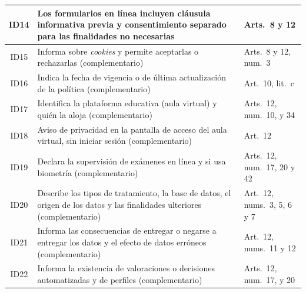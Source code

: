 \documentclass[11pt,a4paper]{article}
\begin{document}
{\begin{tabularx}{\textwidth}{|c|L|>{\raggedright\arraybackslash}p{3.8cm}|}
  ID14 & Los formularios en línea incluyen cláusula informativa previa y consentimiento separado para las finalidades no necesarias & Arts.~8 y 12 \\ \hline
  ID15 & Informa sobre \textit{cookies} y permite aceptarlas o rechazarlas (complementario) & Arts.~8 y 12, num.~3 \\ \hline
  ID16 & Indica la fecha de vigencia o de última actualización de la política (complementario) & Art.~10, lit.~c \\ \hline
  ID17 & Identifica la plataforma educativa (aula virtual) y quién la aloja (complementario) & Arts.~12, num.~10, y 34 \\ \hline
  ID18 & Aviso de privacidad en la pantalla de acceso del aula virtual, sin iniciar sesión (complementario) & Art.~12 \\ \hline
  ID19 & Declara la supervisión de exámenes en línea y si usa biometría (complementario) & Arts.~12, num.~17, 20 y 42 \\ \hline
  ID20 & Describe los tipos de tratamiento, la base de datos, el origen de los datos y las finalidades ulteriores (complementario) & Art.~12, nums.~3, 5, 6 y 7 \\ \hline
  ID21 & Informa las consecuencias de entregar o negarse a entregar los datos y el efecto de datos erróneos (complementario) & Art.~12, nums.~11 y 12 \\ \hline
  ID22 & Informa la existencia de valoraciones o decisiones automatizadas y de perfiles (complementario) & Arts.~12, num.~17, y 20 \\ \hline
\end{tabularx}
}
\end{document}

